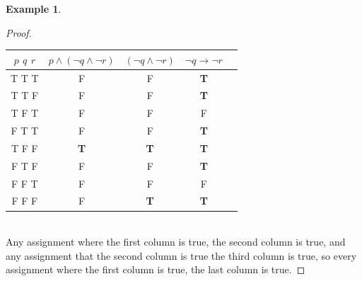 \documentclass[letterpaper,10pt]{article}
\theoremstyle{plain}
\theoremstyle{definition}
\newtheorem{exmp}[thm]{Example}
\theoremstyle{remark}
\providecommand{\land}{\ensuremath{\wedge}}
\begin{document}
\begin{exmp}
\begin{proof}
\begin{tabular}{ | c | c | c |c |c |} 
  \hline
 $p$ $q$ $r$ & $p \land (\lnot q \land \lnot r)$&$(\lnot q \land \lnot r)$&$\lnot q \to \lnot r$\\
 \hline
  T T T  &F &F&\textbf{T}\\
  T T F  &F &F&\textbf{T}\\
  T F T  &F &F&F\\
  F T T  &F &F&\textbf{T}\\
  T F F  &\textbf{T} &\textbf{T}&\textbf{T}\\ 
  F T F  &F &F&\textbf{T}\\ 
  F F T  &F &F&F\\ 
  F F F  &F &\textbf{T}&\textbf{T}\\ 
 \hline
\end{tabular}\\
Any assignment where the first column is true, the second column is true, and any assignment that the second column is true the third column is true, so every assignment where the first column is true, the last column is true.
\end{proof}
\end{exmp}

\newpage
\end{document}
